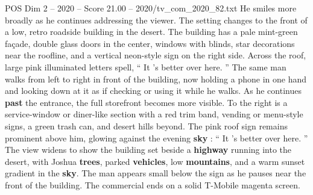 \begin{textsample}{POS Dim 2 – 2020 – Score 21.00 – 2020/tv\_com\_2020\_82.txt}
He smiles more broadly as he continues addressing the viewer.
The setting changes to the front of a low, retro roadside building in the desert.
The building has a pale mint-green façade, double glass doors in the center, windows with blinds, star decorations near the roofline, and a vertical neon-style sign on the right side.
Across the roof, large pink illuminated letters spell, “ It ’s better over here. ” The same man walks from left to right in front of the building, now holding a phone in one hand and looking down at it as if checking or using it while he walks.
As he continues \textbf{past} the entrance, the full storefront becomes more visible.
To the right is a service-window or diner-like section with a red trim band, vending or menu-style signs, a green trash can, and desert hills beyond.
The pink roof sign remains prominent above him, glowing against the evening \textbf{sky} : “ It ’s better over here. ” The view widens to show the building set beside a \textbf{highway} running into the desert, with Joshua \textbf{trees}, parked \textbf{vehicles}, low \textbf{mountains}, and a warm sunset gradient in the \textbf{sky}.
The man appears small below the sign as he pauses near the front of the building.
The commercial ends on a solid T-Mobile magenta screen.

\end{textsample}
